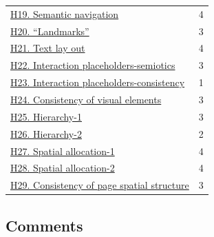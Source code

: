 \begin{longtable}{l r}
	\hyperref[subsec:H19]{H19. Semantic navigation} & 4 \\
	\hyperref[subsec:H20]{H20. “Landmarks”} & 3 \\
	\hyperref[subsec:H21]{H21. Text lay out} & 4 \\
	\hyperref[subsec:H22]{H22. Interaction placeholders-semiotics} & 3 \\
	\hyperref[subsec:H23]{H23. Interaction placeholders-consistency} & 1 \\
	\hyperref[subsec:H24]{H24. Consistency of visual elements} & 3 \\
	\hyperref[subsec:H25]{H25. Hierarchy-1} & 3 \\
	\hyperref[subsec:H26]{H26. Hierarchy-2} & 2 \\
	\hyperref[subsec:H27]{H27. Spatial allocation-1} & 4 \\
	\hyperref[subsec:H28]{H28. Spatial allocation-2} & 4 \\
	\hyperref[subsec:H29]{H29. Consistency of page spatial structure} & 3 \\
	
	
	
\end{longtable}

\endgroup


\clearpage

\subsection*{Comments}
